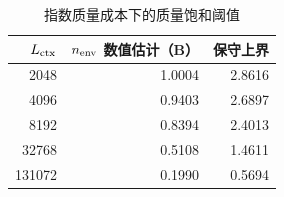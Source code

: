 \begin{table}[H]\centering\small
\caption{指数质量成本下的质量饱和阈值}\label{tab:q3-v39-envelope}
\begin{tabular}{rrr}\toprule $L_{\rm ctx}$ & $n_{\rm env}$ 数值估计（B） & 保守上界\\\midrule
2048 & 1.0004 & 2.8616 \\
4096 & 0.9403 & 2.6897 \\
8192 & 0.8394 & 2.4013 \\
32768 & 0.5108 & 1.4611 \\
131072 & 0.1990 & 0.5694 \\
\bottomrule\end{tabular}\end{table}
